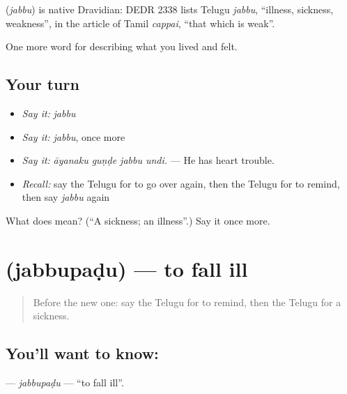 \begin{cousinweb}
\textbf{} (\emph{jabbu}) is native Dravidian: DEDR 2338 lists Telugu \emph{jabbu}, \textquotedblleft{}illness, sickness, weakness\textquotedblright{}, in the article of Tamil \emph{cappai}, \textquotedblleft{}that which is weak\textquotedblright{}.
\end{cousinweb}

\begin{grammarlens}[title={What you've built}]
One more word for describing what you lived and felt.
\end{grammarlens}

\subsection*{Your turn}
\begin{itemize}
\raggedright
  \item \emph{Say it:} \emph{jabbu}
  \item \emph{Say it:} \emph{jabbu}, once more
  \item \emph{Say it:} \emph{āyanaku guṇḍe jabbu undi.} — He has heart trouble.
  \item \emph{Recall:} say the Telugu for to go over again, then the Telugu for to remind, then say \emph{jabbu} again
\end{itemize}

\begin{tcolorbox}[breakable,colback=teal!4,colframe=teal!35!black,title={Before you move on}]
What does  mean? (\textquotedblleft{}A sickness; an illness\textquotedblright{}.) Say it once more.
\end{tcolorbox}
\section[\texorpdfstring{\te{జబ్బుపడు} (jabbupaḍu)}{జబ్బుపడు (jabbupaḍu)}]{ (jabbupaḍu) — to fall ill}

\label{lesson:TE-C512-jabbupadu}



\begin{quote}
Before the new one: say the Telugu for to remind, then the Telugu for a sickness.
\end{quote}

\subsection*{You'll want to know: }
\textbf{} — \emph{jabbupaḍu} — \textquotedblleft{}to fall ill\textquotedblright{}.


